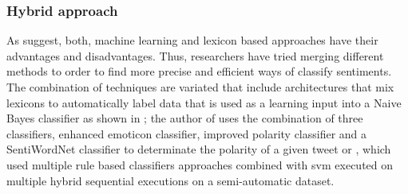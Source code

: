 \subsubsection{Hybrid approach}
\label{subsubsec:techniques_hybrid}

As \cite{thakkar2015approaches} suggest, both, machine learning and lexicon based approaches have their advantages and disadvantages. Thus, researchers have tried merging different methods to order to find more precise and efficient ways of classify sentiments. The combination of techniques are variated that include architectures that mix lexicons to automatically label data that is used as a learning input into a Naive Bayes classifier as shown in \cite{pak2010twitter}; the author of \cite{khan2014tom} uses the combination of three classifiers, enhanced emoticon classifier, improved polarity classifier and a SentiWordNet classifier to determinate the polarity of a given tweet or \cite{prabowo2009sentiment}, which used multiple rule based classifiers approaches combined with \acrshort{svm} executed on multiple hybrid sequential executions on a semi-automatic dataset.